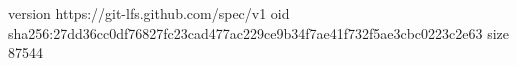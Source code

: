 version https://git-lfs.github.com/spec/v1
oid sha256:27dd36cc0df76827fc23cad477ac229ce9b34f7ae41f732f5ae3cbc0223c2e63
size 87544
